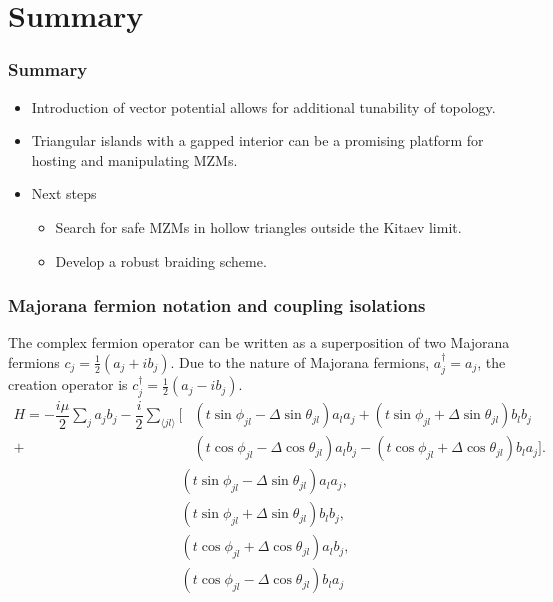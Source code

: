 \documentclass[xcolor=dvipsnames,10pt,aspectratio=169]{beamer}
\newcommand{\cc}{c^{\dagger}}
\newcommand{\de}{\Delta}
\newcommand{\CO}{Summary}
\begin{document}
  \section[Summary]{\CO}
  \begin{frame}
    \frametitle{\CO}

    \begin{itemize}
      \item Introduction of vector potential allows for additional tunability of topology.
      \item Triangular islands with a gapped interior can be a promising platform for hosting and manipulating MZMs.
      \item Next steps
        \begin{itemize}
          \item Search for safe MZMs in hollow triangles outside the Kitaev limit.
          \item Develop a robust braiding scheme.
        \end{itemize}
    \end{itemize}
  \end{frame}


  \appendix

  \begin{frame}
  \frametitle{Majorana fermion notation and coupling isolations}
    The complex fermion operator can be written as a superposition of two Majorana fermions $c_j = \frac{1}{2} (a_j + i b_j)$.
    Due to the nature of Majorana fermions, $a^{\dagger}_j = a_j$, the creation operator is $\cc_j = \frac{1}{2} (a_j - i b_j)$.
    \begin{align*}
      H = -\dfrac{i\mu}{2} \sum_j a_j b_j - \dfrac{i}{2} \sum_{\langle jl\rangle} [&(t\sin\phi_{jl}-\de\sin\theta_{jl}) a_l a_j + (t\sin\phi_{jl}+\de\sin\theta_{jl}) b_l b_j \nonumber \\
      +&(t\cos\phi_{jl}-\de\cos\theta_{jl}) a_l b_j - (t\cos\phi_{jl}+\de\cos\theta_{jl}) b_l a_j].
    \end{align*}
    \begin{align}
      &(t \sin\phi_{jl} - \de \sin\theta_{jl}) a_l a_j, \\
      &(t \sin\phi_{jl} + \de \sin\theta_{jl}) b_l b_j, \\
      &(t \cos\phi_{jl} + \de \cos\theta_{jl}) a_l b_j, \\
      &(t \cos\phi_{jl} - \de \cos\theta_{jl}) b_l a_j
    \end{align}
  \end{frame}
\end{document}
